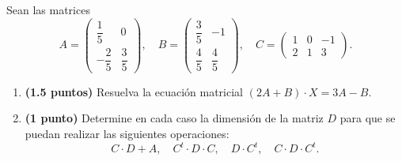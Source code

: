 
Sean las matrices
\[
A=\begin{pmatrix}\dfrac15&0\\[0.7em]-\dfrac25&\dfrac35\end{pmatrix},\quad
B=\begin{pmatrix}\dfrac35&-1\\[0.7em]\dfrac45&\dfrac45\end{pmatrix},\quad
C=\begin{pmatrix}1&0&-1\\2&1&3\end{pmatrix}.
\]
\begin{enumerate}[label=\alph*)]
\item \textbf{(1.5 puntos)} Resuelva la ecuación matricial $(2A+B)\cdot X=3A-B$.
\item \textbf{(1 punto)} Determine en cada caso la dimensión de la matriz $D$ para que se puedan realizar las siguientes operaciones:
\[
C\cdot D+A,\quad C^t\cdot D\cdot C,\quad D\cdot C^t,\quad C\cdot D\cdot C^t.
\]
\end{enumerate}
